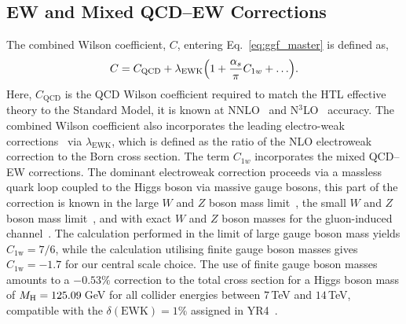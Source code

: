 
\subsection{EW and Mixed QCD--EW Corrections}
\label{sec:ggf_ew}

The combined Wilson coefficient, $C$, entering Eq.~\eqref{eq:ggf_master} is defined as,
\begin{align}
C = C_\mathrm{QCD} + \lambda_\mathrm{EWK} 
\Bigl( 1 + \frac{\alpha_s}{\pi} C_{1w} + \ldots \Bigr).
\end{align}
Here, $C_\mathrm{QCD}$ is the QCD Wilson coefficient required to match the HTL effective theory to the Standard Model, it is known at NNLO~\cite{Kramer:1996iq,Chetyrkin:1997un} and N$^3$LO~\cite{Schroder:2005hy,Chetyrkin:2005ia} accuracy.
The combined Wilson coefficient also incorporates the leading electro-weak corrections~\cite{Aglietti:2004nj,Actis:2008ug} via $\lambda_\mathrm{EWK}$, which is defined as the ratio of the NLO electroweak correction to the Born cross section.
The term $C_{1w}$ incorporates the mixed QCD--EW corrections.
The dominant electroweak correction proceeds via a massless quark loop coupled to the Higgs boson via massive gauge bosons, this part of the correction is known in the large $W$ and $Z$ boson mass limit~\cite{Anastasiou:2008tj}, the small $W$ and $Z$ boson mass limit~\cite{Anastasiou:2018adr}, and with exact $W$ and $Z$ boson masses for the gluon-induced channel~\cite{Bonetti:2016brm,Bonetti:2017ovy,Bonetti:2018ukf,Bonetti:2020hqh,Becchetti:2020wof,Bonetti:2022lrk}.
The calculation performed in the limit of large gauge boson mass yields $C_\mathrm{1w} =7/6$, while the calculation utilising finite gauge boson masses gives $C_\mathrm{1w} = -1.7$ for our central scale choice.
The use of finite gauge boson masses amounts to a $-0.53\%$ correction to the total cross section for a Higgs boson mass of $M_\mathrm{H}=125.09$\,GeV for all collider energies between $7$\,TeV and $14$\,TeV, compatible with the $\delta(\mathrm{EWK})=1\%$ assigned in YR4~\cite{LHCHiggsCrossSectionWorkingGroup:2016ypw}.

